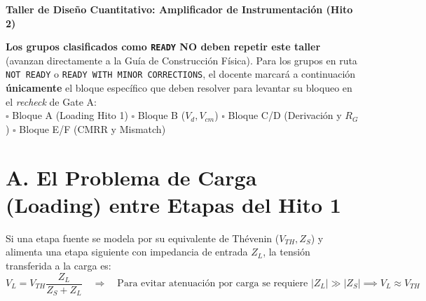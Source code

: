 \documentclass[11pt, a4paper]{article}
\begin{document}
\begin{center}
    \Large\textbf{\textcolor{ucbblue}{Taller de Diseño Cuantitativo: Amplificador de Instrumentación (Hito 2)}}
\end{center}

\begin{tcolorbox}[colback=yellow!10, colframe=ucbblue, title=\textbf{Instrucción de Uso Diferenciado en Semana 12}]
    \raggedright
    \textbf{Los grupos clasificados como \texttt{READY} NO deben repetir este taller} (avanzan directamente a la Guía de Construcción Física). Para los grupos en ruta \texttt{NOT READY} o \texttt{READY WITH MINOR CORRECTIONS}, el docente marcará a continuación \textbf{únicamente} el bloque específico que deben resolver para levantar su bloqueo en el \textit{recheck} de Gate A: \\[0.15cm]
    $\square$ Bloque A (Loading Hito 1) \quad $\square$ Bloque B ($V_d, V_{cm}$) \quad $\square$ Bloque C/D (Derivación y $R_G$) \quad $\square$ Bloque E/F (CMRR y Mismatch)
\end{tcolorbox}

\section*{A. El Problema de Carga (Loading) entre Etapas del Hito 1}
Si una etapa fuente se modela por su equivalente de Thévenin ($V_{TH}, Z_S$) y alimenta una etapa siguiente con impedancia de entrada $Z_L$, la tensión transferida a la carga es:
\begin{equation}
    V_L = V_{TH} \frac{Z_L}{Z_S + Z_L} \quad \Longrightarrow \quad \text{Para evitar atenuación por carga se requiere } |Z_L| \gg |Z_S| \implies V_L \approx V_{TH}
\end{equation}

\begin{center}
\end{center}
\end{document}
